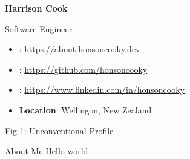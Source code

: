 \documentclass[a4paper, 10pt]{minimal}
\begin{document}
\begin{minipage}{0.68\linewidth}
    {\Huge{\textbf{Harrison Cook}}}
    \vspace{5mm}

    {\Large{Software Engineer}}
    \vspace{5mm}

    \begin{itemize}
        \item {}: \url{https://about.honsoncooky.dev}
        \item {}: \url{https://github.com/honsoncooky}
        \item {}: \url{https://www.linkedin.com/in/honsoncooky}
        \item \textbf{Location}: Wellingon, New Zealand
    \end{itemize}
\end{minipage}
\hfill
\begin{minipage}{0.28\linewidth}
    \centering
    {\footnotesize{Fig 1: Unconventional Profile}}
\end{minipage}

\begin{multicols}{2}
    {\Large{About Me}}
    Hello world

\end{multicols}
\end{document}
